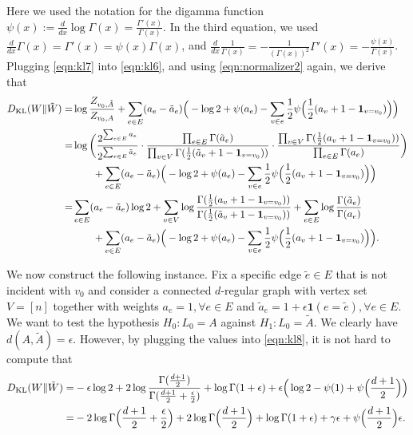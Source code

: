 \documentclass[a4paper, 11pt]{article}
\newcommand{\dkl}{D_{\textnormal{KL}}}
\newcommand{\ind}{\mathbf{1}}
\begin{document}
Here we used the notation for the digamma function $\psi(x):=\frac{d}{dx}\log \Gamma(x)=\frac{\Gamma'(x)}{\Gamma(x)}$. In the third equation, we used $\frac{d}{d x}\Gamma(x)=\Gamma'(x)=\psi(x)\Gamma(x)$, and $\frac{d}{dx}\frac{1}{\Gamma(x)}=-\frac{1}{(\Gamma(x))^2}\Gamma'(x)=-\frac{\psi(x)}{\Gamma(x)}$. Plugging \cref{eqn:kl7} into \cref{eqn:kl6}, and using \cref{eqn:normalizer2} again, we derive that
\begin{align}
\label{eqn:kl8}
\dkl(W\|\tilde{W})
=& \log\frac{Z_{v_0, \tilde{A}}}{Z_{v_0, A}}+\sum_{e\in E}(a_e-\tilde{a}_e) \Big(-\log 2 +\psi(a_e)-\sum_{v\in e}\frac{1}{2}\psi\Big(\frac{1}{2}(a_v+1-\ind_{v=v_0})\Big)\Big)\nonumber \\
=& \log\bigg(\frac{2^{\sum_{e\in E}a_e}}{2^{\sum_{e\in E}\tilde{a}_e}}\cdot \frac{\prod_{e\in E}\Gamma(\tilde{a}_e)}{\prod_{v\in V}\Gamma(\frac{1}{2}(\tilde{a}_v+1-\ind_{v=v_0}))} \cdot \frac{\prod_{v\in V}\Gamma(\frac{1}{2}(a_v+1-\ind_{v=v_0}))}{\prod_{e\in E}\Gamma(a_e)}\bigg)\nonumber \\
& \qquad +\sum_{e\in E}(a_e-\tilde{a}_e) \Big(-\log 2 +\psi(a_e)-\sum_{v\in e}\frac{1}{2}\psi\Big(\frac{1}{2}(a_v+1-\ind_{v=v_0})\Big)\Big)\nonumber \\
=& \sum_{e\in E}(a_e-\tilde{a}_e)\log 2 
+ \sum_{v\in V}\log\frac{\Gamma(\frac{1}{2}(a_v+1-\ind_{v=v_0}))}{\Gamma(\frac{1}{2}(\tilde{a}_v+1-\ind_{v=v_0}))}
+ \sum_{e\in E}\log \frac{\Gamma(\tilde{a}_e)}{\Gamma(a_e)}\nonumber \\
& \qquad +\sum_{e\in E}(a_e-\tilde{a}_e)\Big(-\log 2 +\psi(a_e)-\sum_{v\in e}\frac{1}{2}\psi\Big(\frac{1}{2}(a_v+1-\ind_{v=v_0})\Big)\Big).
\end{align}

We now construct the following instance. Fix a specific edge $\tilde{e}\in E$ that is not incident with $v_0$ and consider a connected $d$-regular graph with vertex set $V=[n]$ together with weights $a_e=1, \forall e\in E$ and $\tilde{a}_e=1+\epsilon \ind(e=\tilde{e}), \forall e\in E$. 
We want to test the hypothesis $H_0:L_0=A$ against $H_1:L_0=\tilde{A}$. We clearly have $d(A,\tilde{A})=\epsilon$. However, by plugging the values into \cref{eqn:kl8}, it is not hard to compute that
\begin{align*}
\dkl(W\|\tilde{W})
=& -\epsilon\log 2 
+ 2\log\frac{\Gamma(\frac{d+1}{2})}{\Gamma(\frac{d+1}{2}+\frac{\epsilon}{2})} + \log \Gamma(1+\epsilon) +\epsilon \Big(\log 2 -\psi(1)+\psi\Big(\frac{d+1}{2}\Big)\Big)\\
=&
- 2\log \Gamma\Big(\frac{d+1}{2}+\frac{\epsilon}{2}\Big)+2\log \Gamma\Big(\frac{d+1}{2}\Big)+ \log \Gamma(1+\epsilon) +\gamma\epsilon+\psi\Big(\frac{d+1}{2}\Big)\epsilon.
\end{align*}
\end{document}
